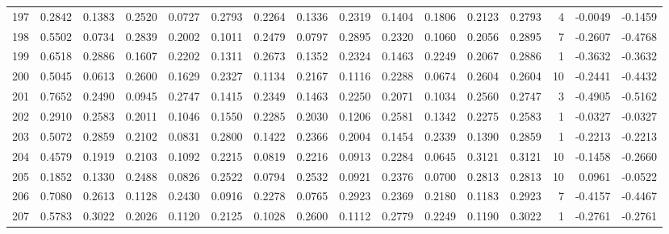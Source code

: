 \begin{tabular}{lrrrrrrrrrrrrrrr}
197 &      0.2842 &  0.1383 &  0.2520 &  0.0727 &  0.2793 &  0.2264 &  0.1336 &  0.2319 &  0.1404 &  0.1806 &   0.2123 &     0.2793 &      4 &                   -0.0049 &                    -0.1459 \\
198 &      0.5502 &  0.0734 &  0.2839 &  0.2002 &  0.1011 &  0.2479 &  0.0797 &  0.2895 &  0.2320 &  0.1060 &   0.2056 &     0.2895 &      7 &                   -0.2607 &                    -0.4768 \\
199 &      0.6518 &  0.2886 &  0.1607 &  0.2202 &  0.1311 &  0.2673 &  0.1352 &  0.2324 &  0.1463 &  0.2249 &   0.2067 &     0.2886 &      1 &                   -0.3632 &                    -0.3632 \\
200 &      0.5045 &  0.0613 &  0.2600 &  0.1629 &  0.2327 &  0.1134 &  0.2167 &  0.1116 &  0.2288 &  0.0674 &   0.2604 &     0.2604 &     10 &                   -0.2441 &                    -0.4432 \\
201 &      0.7652 &  0.2490 &  0.0945 &  0.2747 &  0.1415 &  0.2349 &  0.1463 &  0.2250 &  0.2071 &  0.1034 &   0.2560 &     0.2747 &      3 &                   -0.4905 &                    -0.5162 \\
202 &      0.2910 &  0.2583 &  0.2011 &  0.1046 &  0.1550 &  0.2285 &  0.2030 &  0.1206 &  0.2581 &  0.1342 &   0.2275 &     0.2583 &      1 &                   -0.0327 &                    -0.0327 \\
203 &      0.5072 &  0.2859 &  0.2102 &  0.0831 &  0.2800 &  0.1422 &  0.2366 &  0.2004 &  0.1454 &  0.2339 &   0.1390 &     0.2859 &      1 &                   -0.2213 &                    -0.2213 \\
204 &      0.4579 &  0.1919 &  0.2103 &  0.1092 &  0.2215 &  0.0819 &  0.2216 &  0.0913 &  0.2284 &  0.0645 &   0.3121 &     0.3121 &     10 &                   -0.1458 &                    -0.2660 \\
205 &      0.1852 &  0.1330 &  0.2488 &  0.0826 &  0.2522 &  0.0794 &  0.2532 &  0.0921 &  0.2376 &  0.0700 &   0.2813 &     0.2813 &     10 &                    0.0961 &                    -0.0522 \\
206 &      0.7080 &  0.2613 &  0.1128 &  0.2430 &  0.0916 &  0.2278 &  0.0765 &  0.2923 &  0.2369 &  0.2180 &   0.1183 &     0.2923 &      7 &                   -0.4157 &                    -0.4467 \\
207 &      0.5783 &  0.3022 &  0.2026 &  0.1120 &  0.2125 &  0.1028 &  0.2600 &  0.1112 &  0.2779 &  0.2249 &   0.1190 &     0.3022 &      1 &                   -0.2761 &                    -0.2761 \\

\end{tabular}
